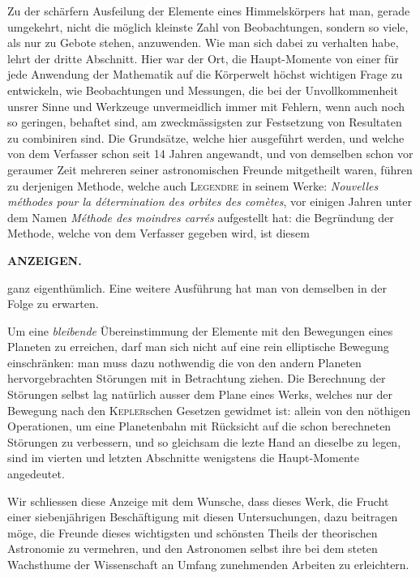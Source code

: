 Zu der schärfern Ausfeilung der Elemente eines Himmelskörpers hat man,
gerade umgekehrt, nicht die möglich kleinste Zahl von Beobachtungen, sondern
so viele, als nur zu Gebote stehen, anzuwenden. Wie man sich dabei zu verhalten
habe, lehrt der dritte Abschnitt. Hier war der Ort, die Haupt-Momente
von einer für jede Anwendung der Mathematik auf die Körperwelt höchst wichtigen
Frage zu entwickeln, wie Beobachtungen und Messungen, die bei der Unvollkommenheit
unsrer Sinne und Werkzeuge unvermeidlich immer mit Fehlern,
wenn auch noch so geringen, behaftet sind, am zweckmässigsten zur Festsetzung
von Resultaten zu combiniren sind. Die Grundsätze, welche hier ausgeführt
werden, und welche von dem Verfasser schon seit 14 Jahren angewandt, und von
demselben schon vor geraumer Zeit mehreren seiner astronomischen Freunde mitgetheilt
waren, führen zu derjenigen Methode, welche auch \textsc{Legendre} in seinem
Werke: \textit{Nouvelles méthodes pour la détermination des orbites des comètes}, vor einigen
Jahren unter dem Namen \textit{Méthode des moindres carrés} aufgestellt hat: die
Begründung der Methode, welche von dem Verfasser gegeben wird, ist diesem
\par\GaussVIGathering{}{8\textsuperscript{*}}
\par\clearpage
\thispagestyle{empty}
\noindent{}%
%
\parbox[t]{\dimexpr\linewidth-24mm\relax}{\centering\footnotesize\bfseries ANZEIGEN.\par}%
\makebox[12mm][r]{}\par\nobreak\medskip
\noindent ganz eigenthümlich. Eine weitere Ausführung hat man von demselben in der
Folge zu erwarten.

Um eine \textit{bleibende} Übereinstimmung der Elemente mit den Bewegungen eines
Planeten zu erreichen, darf man sich nicht auf eine rein elliptische Bewegung
einschränken: man muss dazu nothwendig die von den andern Planeten
hervorgebrachten Störungen mit in Betrachtung ziehen. Die Berechnung der Störungen
selbst lag natürlich ausser dem Plane eines Werks, welches nur der Bewegung
nach den \textsc{Kepler}schen Gesetzen gewidmet ist: allein von den nöthigen
Operationen, um eine Planetenbahn mit Rücksicht auf die schon berechneten
Störungen zu verbessern, und so gleichsam die lezte Hand an dieselbe zu legen,
sind im vierten und letzten Abschnitte wenigstens die Haupt-Momente angedeutet.

Wir schliessen diese Anzeige mit dem Wunsche, dass dieses Werk, die
Frucht einer siebenjährigen Beschäftigung mit diesen Untersuchungen, dazu beitragen
möge, die Freunde dieses wichtigsten und schönsten Theils der theorischen
Astronomie zu vermehren, und den Astronomen selbst ihre bei dem steten
Wachsthume der Wissenschaft an Umfang zunehmenden Arbeiten zu erleichtern.
\par\nobreak\vspace{.15\linewidth}
\noindent\makebox[\linewidth][c]{\rule{.255\linewidth}{.3pt}}\par
\par\clearpage
\endgroup
